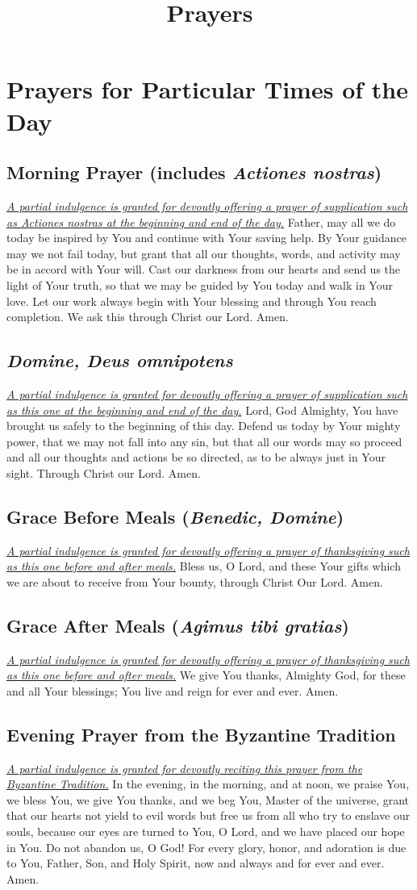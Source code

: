 \documentclass[12pt]{article}
\newcommand{\prayersection}[1]{\section{#1}}
\newcommand{\prayertitle}[1]{\subsection{#1}}
\newcommand{\indulgencedprayertitle}[1]{\prayertitle{#1 \protect\kreuz}}
\newcommand{\foreign}[1]{\textsl{#1}}
\newcommand{\note}[1]{{\small{\textsl{#1}}}\newline}
\newcommand{\linkednote}[2]{\hyperlink{#1}{\note{#2}}}
\begin{document}
\title{\textbf{Prayers}\date{\vspace{-10ex}}}\maketitle
\tableofcontents\newpage

\prayersection{Prayers for Particular Times of the Day}
\indulgencedprayertitle{Morning Prayer (includes \foreign{Actiones nostras})}
\linkednote{grant26}{A partial indulgence is granted for devoutly offering a prayer of supplication such as \foreign{Actiones nostras} at the beginning and end of the day.}
Father, may all we do today be inspired by You and continue with Your saving help.
By Your guidance may we not fail today, but grant that all our thoughts, words, and activity may be in accord with Your will.
Cast our darkness from our hearts and send us the light of Your truth, so that we may be guided by You today and walk in Your love.
Let our work always begin with Your blessing and through You reach completion.
We ask this through Christ our Lord.
Amen.

\indulgencedprayertitle{\foreign{Domine, Deus omnipotens}}
\linkednote{grant26}{A partial indulgence is granted for devoutly offering a prayer of supplication such as this one at the beginning and end of the day.}
Lord, God Almighty, You have brought us safely to the beginning of this day.
Defend us today by Your mighty power, that we may not fall into any sin, but that all our words may so proceed and all our thoughts and actions be so directed, as to be always just in Your sight.
Through Christ our Lord.
Amen.

\indulgencedprayertitle{Grace Before Meals (\foreign{Benedic, Domine})}
\linkednote{grant26}{A partial indulgence is granted for devoutly offering a prayer of thanksgiving such as this one before and after meals.}
Bless us, O Lord, and these Your gifts which we are about to receive from Your bounty, through Christ Our Lord.
Amen.

\indulgencedprayertitle{Grace After Meals (\foreign{Agimus tibi gratias})}
\linkednote{grant26}{A partial indulgence is granted for devoutly offering a prayer of thanksgiving such as this one before and after meals.}
We give You thanks, Almighty God, for these and all Your blessings;
You live and reign for ever and ever.
Amen.
\newpage
\indulgencedprayertitle{Evening Prayer from the Byzantine Tradition}
\linkednote{grant23}{A partial indulgence is granted for devoutly reciting this prayer from the Byzantine Tradition.}
In the evening, in the morning, and at noon, we praise You, we bless You,
we give You thanks, and we beg You, Master of the universe, grant that our hearts not yield to evil words but free us from all who try to enslave our souls, because our eyes are turned to You, O Lord, and we have placed our hope in You.
Do not abandon us, O God!
For every glory, honor, and adoration is due to You, Father, Son, and Holy Spirit, now and always and for ever and ever.
Amen.
\end{document}
